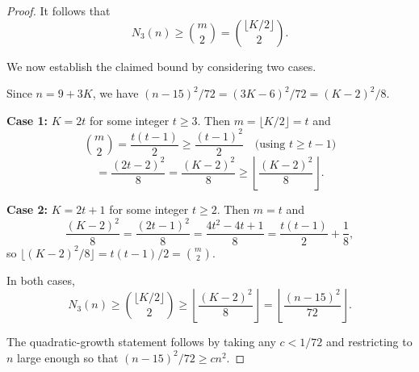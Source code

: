 \documentclass[10pt,a4paper]{amsart}
\begin{document}
\begin{proof}
It follows that
\[
N_3(n)\ge\binom{m}{2}=\binom{\lfloor K/2\rfloor}{2}.
\]

We now establish the claimed bound by considering two cases.

Since $n=9+3K$, we have $(n-15)^2/72=(3K-6)^2/72=(K-2)^2/8$.

\textbf{Case 1:} $K=2t$ for some integer $t\ge 3$.
Then $m=\lfloor K/2\rfloor=t$ and
\[
\binom{m}{2}=\frac{t(t-1)}{2}\ge \frac{(t-1)^2}{2}
\quad\text{(using $t\ge t-1$)}
\]
\[
=\frac{(2t-2)^2}{8}=\frac{(K-2)^2}{8}
\ge \left\lfloor \frac{(K-2)^2}{8}\right\rfloor.
\]

\textbf{Case 2:} $K=2t+1$ for some integer $t\ge 2$.
Then $m=t$ and
\[
\frac{(K-2)^2}{8}=\frac{(2t-1)^2}{8}=\frac{4t^2-4t+1}{8}=\frac{t(t-1)}{2}+\frac{1}{8},
\]
so $\lfloor (K-2)^2/8\rfloor=t(t-1)/2=\binom{m}{2}$.

In both cases,
\[
N_3(n)\ge\binom{\lfloor K/2\rfloor}{2}\ge\left\lfloor \frac{(K-2)^2}{8}\right\rfloor
=\left\lfloor \frac{(n-15)^2}{72}\right\rfloor.
\]

The quadratic-growth statement follows by taking any $c<1/72$ and restricting to $n$ large enough so that $(n-15)^2/72\ge cn^2$.
\end{proof}
\end{document}
